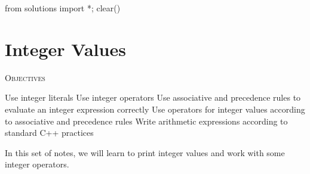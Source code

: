 \begin{python0}
from solutions import *; clear()
\end{python0}
\chapter{Integer Values}


\textsc{Objectives}
\begin{tightlist}
\li Use integer literals
\li Use integer operators
\li Use associative and precedence rules to evaluate an integer
expression correctly
\li Use operators for integer values according to associative and
precedence rules
\li Write arithmetic expressions according to standard C++
practices
\end{tightlist}

In this set of notes, we will learn to print integer values and work with
some integer operators.


